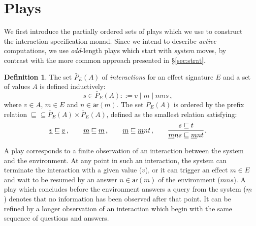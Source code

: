 \documentclass[draft,11pt]{report}
\theoremstyle{definition}
\newtheorem{definition}[theorem]{Definition}
\newcommand{\kw}[1]{\ensuremath{ \mathsf{#1} }}
\begin{document}

\section{Plays} \label{sec:intm:plays} %

We first introduce the partially ordered sets of plays
which we use to construct the interaction specification monad.
Since we intend to describe \emph{active} computations,
we use \emph{odd}-length plays which start with \emph{system} moves,
by contrast with the more common approach
presented in \S\ref{sec:strat}.

\begin{definition}
The set $\bar{P}_E(A)$ of \emph{interactions}
for an effect signature $E$ and a set of values $A$
is defined inductively:
\[
  s \in \bar{P}_E(A) ::=
    \underline{v} \mid
    \underline{m} \mid
    \underline{m} n s \,,
\]
where $v \in A$, $m \in E$ and $n \in \kw{ar}(m)$.
The set $\bar{P}_E(A)$ is ordered by the prefix relation
${\sqsubseteq} \subseteq \bar{P}_E(A) \times \bar{P}_E(A)$,
defined
as the smallest relation satisfying:
\[
  \underline{v} \sqsubseteq \underline{v} \,, \qquad
  \underline{m} \sqsubseteq \underline{m} \,, \qquad
  \underline{m} \sqsubseteq \underline{m} n t \,, \qquad
  \begin{prooftree}
    \hypo{s \sqsubseteq t}
    \infer1{\underline{m} n s \sqsubseteq \underline{m} n t}
  \end{prooftree} \,.
\]
\end{definition}

A play corresponds to a finite observation of
an interaction between the system and the environment.
At any point in such an interaction,
the system can terminate the interaction with a given value ($v$),
or it can trigger an effect $m \in E$ and
wait to be resumed by
an answer $n \in \kw{ar}(m)$ of the environment
($\underline{m} n s$).
%
A play which concludes before
the environment answers a query from the system ($\underline{m}$)
denotes that no information has been observed after that point.
It can be refined by a longer observation
of an interaction which begin with the same sequence of
questions and answers.

%
%

\end{document}
